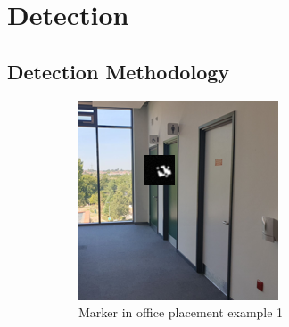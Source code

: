 \documentclass[conference]{IEEEtran}
\begin{document}
\section{Detection}

\subsection{Detection Methodology}

\begin{figure}[h]
  \centering
  \begin{subfigure}[b]{0.2\textwidth}
      \centering
      \includegraphics[width=\textwidth]{images/aruco-file4-detection-1.png}
      \caption{Marker in office placement example 1}
      \label{fig:det_ex_1}
  \end{subfigure}
  \hfill
  \begin{subfigure}[b]{0.2\textwidth}
      \centering

\end{subfigure}
\end{figure}
\end{document}
